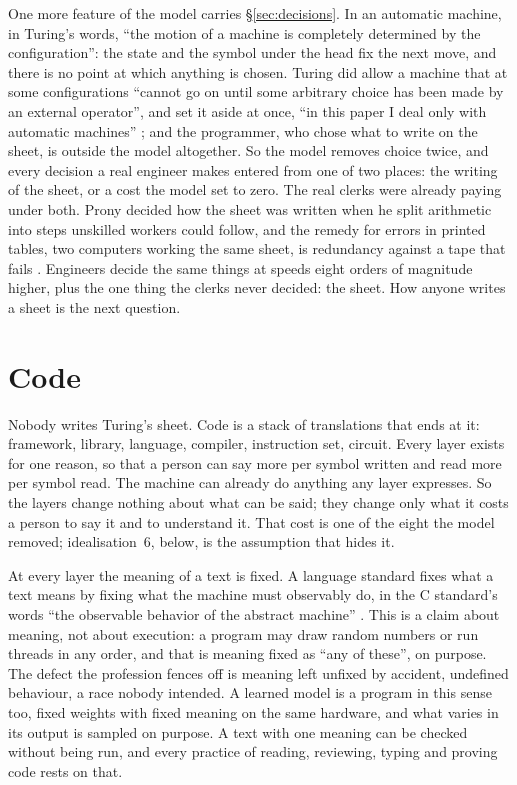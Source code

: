 \documentclass[11pt,oneside]{article}
\theoremstyle{definition}
\theoremstyle{remark}
\begin{document}
One more feature of the model carries \S\ref{sec:decisions}. In an automatic machine, in
Turing's words, ``the motion of a machine is completely determined by the configuration'':
the state and the symbol under the head fix the next move, and there is no point at which
anything is chosen. Turing did allow a machine that at some configurations ``cannot go on
until some arbitrary choice has been made by an external operator'', and set it aside at
once, ``in this paper I deal only with automatic machines'' \cite{turing1936}; and the
programmer, who chose what to write on the sheet, is outside the model altogether. So the
model removes choice twice, and every decision a real engineer makes entered from one of
two places: the writing of the sheet, or a cost the model set to zero. The real clerks were
already paying under both. Prony decided how the sheet was written when he split
arithmetic into steps unskilled workers could follow, and the remedy for errors in printed
tables, two computers working the same sheet, is redundancy against a tape that fails
\cite{grier2005}. Engineers decide the same things at speeds eight orders of magnitude
higher, plus the one thing the clerks never decided: the sheet. How anyone writes a sheet
is the next question.

\section{Code}\label{sec:code}
Nobody writes Turing's sheet. Code is a stack of translations that ends at it: framework,
library, language, compiler, instruction set, circuit. Every layer exists for one reason,
so that a person can say more per symbol written and read more per symbol read. The
machine can already do anything any layer expresses. So the layers change nothing about
what can be said; they change only what it costs a person to say it and to understand it.
That cost is one of the eight the model removed; idealisation~6, below, is the assumption
that hides it.

At every layer the meaning of a text is fixed. A language standard fixes what a text means
by fixing what the machine must observably do, in the C standard's words ``the observable
behavior of the abstract machine'' \cite{c11}. This is a claim about meaning, not about
execution: a program may draw random numbers or run threads in any order, and that is
meaning fixed as ``any of these'', on purpose. The defect the profession fences off is
meaning left unfixed by accident, undefined behaviour, a race nobody intended. A learned model is a program in this sense too, fixed weights with fixed meaning on the
same hardware, and what varies in its output is sampled on purpose. A text with one
meaning can be checked without being run, and every practice of reading, reviewing, typing
and proving code rests on that.
\end{document}
